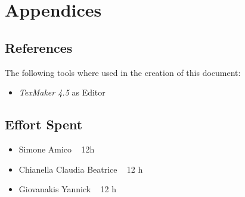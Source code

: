 \documentclass[12pt]{article}
\begin{document}
	
	
			
	\section{Appendices}
		\subsection{References}
		The following tools where used in the creation of this document:
		\begin{itemize}
		\item \emph{TexMaker 4.5} as Editor
		
		\end{itemize}
		
		\subsection{Effort Spent}
		\begin{itemize}
		\item Simone Amico ~  12h
		\item Chianella Claudia Beatrice ~ 12 h
		\item Giovanakis Yannick ~ 12 h
		\end{itemize}

	 
	
\end{document}
